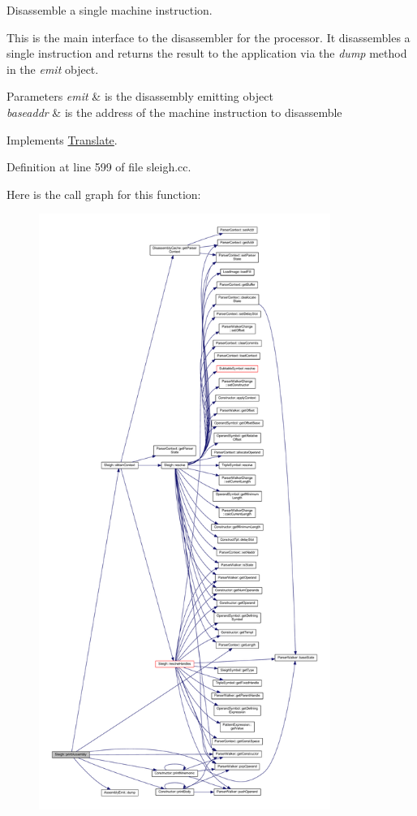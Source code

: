 Disassemble a single machine instruction. 

This is the main interface to the disassembler for the processor. It disassembles a single instruction and returns the result to the application via the {\itshape dump} method in the {\itshape emit} object. 
\begin{DoxyParams}{Parameters}
{\em emit} & is the disassembly emitting object \\
\hline
{\em baseaddr} & is the address of the machine instruction to disassemble \\
\hline
\end{DoxyParams}


Implements \mbox{\hyperlink{class_translate_ac97443bb89e0c6bfb68caf9f48a8c85d}{Translate}}.



Definition at line 599 of file sleigh.\+cc.

Here is the call graph for this function\+:
\nopagebreak
\begin{figure}[H]
\begin{center}
\leavevmode
\includegraphics[height=550pt]{class_sleigh_a21c8622098202b1746bcda972d59d9aa_cgraph}
\end{center}
\end{figure}
\mbox{\label{class_sleigh_a7df1e3c0c4e2fa3090b6e38f53498aa1}} 
